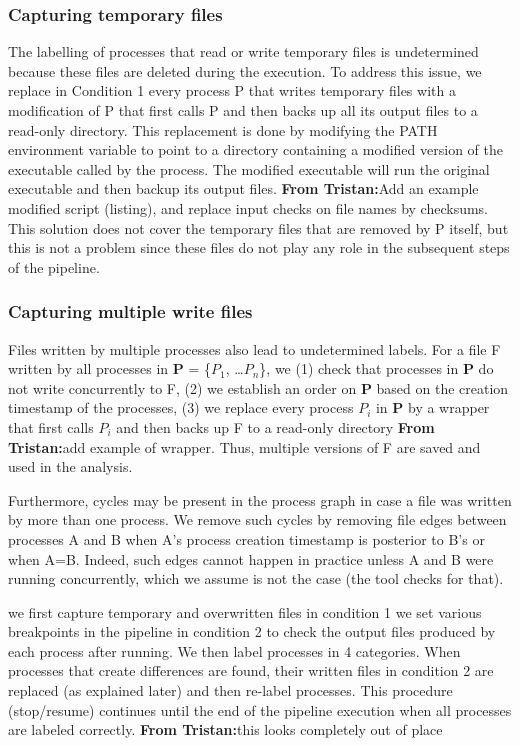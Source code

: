 \documentclass[a4paper,num-refs]{oup-contemporary}
\newcommand{\tristan}[1]{\color{blue}\textbf{From Tristan:}#1\color{black}}
\begin{document}
\subsubsection{Capturing temporary files} 

The labelling of processes that read or 
write temporary files is undetermined because these files are deleted during 
the execution. To address this issue, we replace in Condition 1 every process P that 
writes temporary files with a modification of P that first calls P and then
backs up all its output files to a read-only directory. This replacement is
done by modifying the PATH environment variable to point to a directory
containing a modified version of the executable called by the process. The
modified executable will run the original executable and then backup its
output files. \tristan{Add an example modified script (listing), and replace input checks on file names by checksums.}
This 
solution does not cover the temporary files that are removed by P 
itself, but this is not a problem since these files do not play any role in 
the subsequent steps of the pipeline. 

\subsubsection{Capturing multiple write files}

Files written by multiple processes also lead 
to undetermined labels. For a file F 
written by all processes in \textbf{P} = \{$P_{1}$, \ldots $P_{n}$\}, we 
(1) check that processes in \textbf{P} do not write concurrently to F, 
(2) we establish an order on \textbf{P} based on the creation timestamp 
of the processes, (3) we replace every process $P_{i}$ in \textbf{P} by 
a wrapper that first calls $P_{i}$ and then backs up F to a read-only 
directory \tristan{add example of wrapper}. Thus, multiple versions of F are saved and used in the 
analysis. 

Furthermore, cycles may be present in the process graph in case a file 
was written by more than one process. We remove such cycles by removing 
file edges between processes A and B when A's process creation 
timestamp is posterior to B's or when A=B. Indeed, such edges cannot 
happen in practice unless A and B were running concurrently, which we 
assume is not the case (the tool checks for that). 

we first capture temporary and overwritten files in condition 1
we set various 
breakpoints in the pipeline in condition 2 to check the output files 
produced by each process after running. We then label processes in 4 
categories. When processes that create differences are 
found, their written files in condition 2 are replaced (as explained 
later) and then re-label processes. This procedure (stop/resume) 
continues until the end of the pipeline execution when all processes 
are labeled correctly. \tristan{this looks completely out of place}
\end{document}
